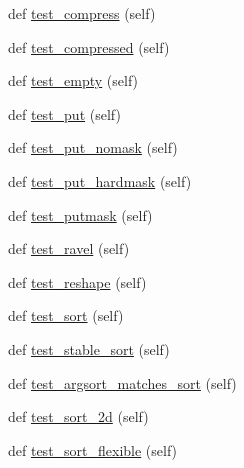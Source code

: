 \begin{DoxyCompactItemize}
def \hyperlink{classnumpy_1_1ma_1_1tests_1_1test__core_1_1TestMaskedArrayMethods_a70d295b9e063e1b78322b78b942d7f5e}{test\+\_\+compress} (self)
\item 
def \hyperlink{classnumpy_1_1ma_1_1tests_1_1test__core_1_1TestMaskedArrayMethods_ae5e0e67c6ec76fedcba64a7170a53cd9}{test\+\_\+compressed} (self)
\item 
def \hyperlink{classnumpy_1_1ma_1_1tests_1_1test__core_1_1TestMaskedArrayMethods_aba5fb0c715377882bc827d4e70dac580}{test\+\_\+empty} (self)
\item 
def \hyperlink{classnumpy_1_1ma_1_1tests_1_1test__core_1_1TestMaskedArrayMethods_a1276e9c1e4314bfd31eb5df2f4a1d7fb}{test\+\_\+put} (self)
\item 
def \hyperlink{classnumpy_1_1ma_1_1tests_1_1test__core_1_1TestMaskedArrayMethods_a1495b5749e5b5fa0fd12ca7be3db6af3}{test\+\_\+put\+\_\+nomask} (self)
\item 
def \hyperlink{classnumpy_1_1ma_1_1tests_1_1test__core_1_1TestMaskedArrayMethods_af2225f2ad5cc613a9dee814764e29c98}{test\+\_\+put\+\_\+hardmask} (self)
\item 
def \hyperlink{classnumpy_1_1ma_1_1tests_1_1test__core_1_1TestMaskedArrayMethods_a7dbc99f10721cb301179bf243dcff2fe}{test\+\_\+putmask} (self)
\item 
def \hyperlink{classnumpy_1_1ma_1_1tests_1_1test__core_1_1TestMaskedArrayMethods_a1abd3b5718d45103dd2c2fc187c18c0d}{test\+\_\+ravel} (self)
\item 
def \hyperlink{classnumpy_1_1ma_1_1tests_1_1test__core_1_1TestMaskedArrayMethods_a39861d44cf57a750237f4c9a767c5b9f}{test\+\_\+reshape} (self)
\item 
def \hyperlink{classnumpy_1_1ma_1_1tests_1_1test__core_1_1TestMaskedArrayMethods_ae1795d0632c29c1e523768f287e093ed}{test\+\_\+sort} (self)
\item 
def \hyperlink{classnumpy_1_1ma_1_1tests_1_1test__core_1_1TestMaskedArrayMethods_aab244b5416b8168bb9779594e6cd4f10}{test\+\_\+stable\+\_\+sort} (self)
\item 
def \hyperlink{classnumpy_1_1ma_1_1tests_1_1test__core_1_1TestMaskedArrayMethods_a7207696ba897a145db2e3fdc26594756}{test\+\_\+argsort\+\_\+matches\+\_\+sort} (self)
\item 
def \hyperlink{classnumpy_1_1ma_1_1tests_1_1test__core_1_1TestMaskedArrayMethods_a2e1cba2271ce25fb6823f866d29389a1}{test\+\_\+sort\+\_\+2d} (self)
\item 
def \hyperlink{classnumpy_1_1ma_1_1tests_1_1test__core_1_1TestMaskedArrayMethods_a8e30773d54d7a09bda85943e40b88453}{test\+\_\+sort\+\_\+flexible} (self)

\end{DoxyCompactItemize}
